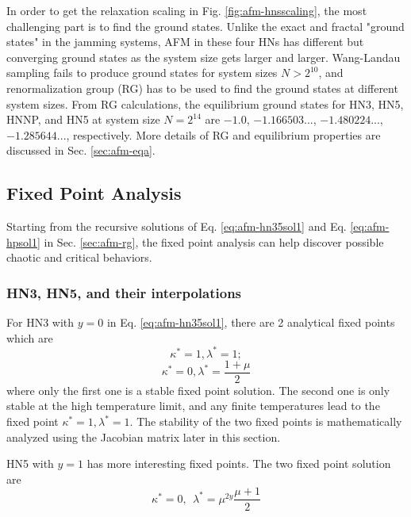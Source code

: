 In order to get the relaxation scaling in Fig. \ref{fig:afm-hnsscaling}, the most challenging part is to find the ground states. Unlike the exact and fractal "ground states" in the jamming systems, AFM in these four HNs has different but converging ground states as the system size gets larger and larger. Wang-Landau sampling fails to produce ground states for system sizes $N>2^{10}$, and renormalization group (RG) has to be used to find the ground states at different system sizes. From RG calculations, the equilibrium ground states for HN3, HN5, HNNP, and HN5 at system size $N=2^{14}$ are $-1.0$, $-1.166503...$, $-1.480224...$, $-1.285644...$, respectively.  More details of  RG and equilibrium properties are discussed in Sec. \ref{sec:afm-eqa}.

\subsection{Fixed Point Analysis}
\label{sec:afm-fpa}
Starting from the recursive solutions of Eq. \ref{eq:afm-hn35sol1} and Eq. \ref{eq:afm-hpsol1} in Sec. \ref{sec:afm-rg}, the fixed point analysis can help discover possible chaotic and critical behaviors. 

\subsubsection{ HN3, HN5, and their interpolations }
For HN3 with $y=0$ in Eq. \ref{eq:afm-hn35sol1}, there are 2 analytical fixed points which are
\begin{equation}
\displaystyle \kappa^* = 1, \lambda^* =1; 
\label{eq:afm-fps3-1}
\end{equation}
\begin{equation}
\displaystyle \kappa^* = 0, \lambda^* =\frac{1+\mu}{2} 
\label{eq:afm-fps3-2}
\end{equation}
where only the first one is a stable fixed point solution. The second one is only stable at the high temperature limit, and any finite temperatures lead to the fixed point $\kappa^* =1, \lambda^* = 1.$ The stability of the two fixed points is mathematically analyzed using the Jacobian matrix later in this section.

HN5 with $y=1$ has more interesting fixed points. The two fixed point solution are
\begin{equation}
\kappa^* = 0, \ \  \lambda^* = \mu^{2y}\frac{\mu+1}{2}
\label{eq:afm-fps5-1}
\end{equation}


